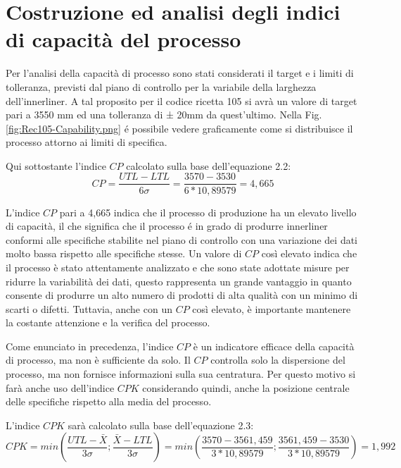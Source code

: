 \label{Costruzione ed analisi degli indici di capacità del processo}
\section{Costruzione ed analisi degli indici di capacità del processo}



Per l'analisi della capacità di processo sono stati considerati il target e i limiti di tolleranza, previsti dal piano di controllo per la variabile della larghezza dell'innerliner.
A tal proposito per il codice ricetta 105 si avrà un valore di target pari a 3550 mm ed una tolleranza di ± 20mm da quest'ultimo.
Nella Fig. \ref{fig:Rec105-Capability.png} é possibile vedere graficamente come si distribuisce il processo attorno ai limiti di specifica.

Qui sottostante l'indice $CP$ calcolato sulla base dell'equazione 2.2:
\begin{equation*} CP = \frac{UTL-LTL}{6\sigma} = \frac{3570-3530}{6 * 10,89579} = 4,665
\label {eqn: CP_105}
\end{equation*}

L'indice $CP$ pari a 4,665 indica che il processo di produzione ha un elevato livello di capacità, il che significa che il processo é in grado di produrre innerliner conformi alle specifiche stabilite nel piano di controllo con una variazione dei dati molto bassa rispetto alle specifiche stesse.
Un valore di $CP$ così elevato indica che il processo è stato attentamente analizzato e che sono state adottate misure per ridurre la variabilità dei dati, questo rappresenta un grande vantaggio in quanto consente di produrre un alto numero di prodotti di alta qualità con un minimo di scarti o difetti. 
Tuttavia, anche con un $CP$ così elevato, è importante mantenere la costante attenzione e la verifica del processo.

Come enunciato in precedenza, l'indice $CP$ è un indicatore efficace della capacità di processo, ma non è sufficiente da solo. 
Il $CP$ controlla solo la dispersione del processo, ma non fornisce informazioni sulla sua centratura. Per questo motivo si farà anche uso dell'indice $CPK$ considerando quindi, anche la posizione centrale delle specifiche rispetto alla media del processo. 

L'indice $CPK$ sarà calcolato sulla base dell'equazione 2.3:
\begin{equation*}CPK = min\left(\frac{UTL-\bar{X}}{3\sigma} ; 
\frac{\bar{X}-LTL}{3\sigma}\right) = min\left(\frac{3570-3561,459}{3*10,89579} ; \frac{3561,459-3530}{3*10,89579}\right) = 1,992
\label {eqn: CPK_105}
\end{equation*}

